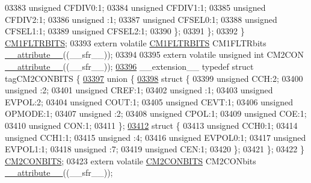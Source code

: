 \begin{DoxyCode}
03383       \textcolor{keywordtype}{unsigned} CFDIV0:1;
03384       \textcolor{keywordtype}{unsigned} CFDIV1:1;
03385       \textcolor{keywordtype}{unsigned} CFDIV2:1;
03386       \textcolor{keywordtype}{unsigned} :1;
03387       \textcolor{keywordtype}{unsigned} CFSEL0:1;
03388       \textcolor{keywordtype}{unsigned} CFSEL1:1;
03389       \textcolor{keywordtype}{unsigned} CFSEL2:1;
03390     \};
03391   \};
03392 \} \hyperlink{a00008_d0/d61/a00302}{CM1FLTRBITS};
03393 \textcolor{keyword}{extern} \textcolor{keyword}{volatile} \hyperlink{a00008_d0/d61/a00302}{CM1FLTRBITS} CM1FLTRbits \hyperlink{a00009_a493c46f03454991ccc5aa7a6e1dfb2a7}{\_\_attribute\_\_}((\_\_sfr\_\_));
03394 
03395 \textcolor{keyword}{extern} \textcolor{keyword}{volatile} \textcolor{keywordtype}{unsigned} \textcolor{keywordtype}{int}  CM2CON \hyperlink{a00009_a493c46f03454991ccc5aa7a6e1dfb2a7}{\_\_attribute\_\_}((\_\_sfr\_\_));
\hypertarget{a00009_source_l03396}{}\hyperlink{a00008}{03396} \_\_extension\_\_ \textcolor{keyword}{typedef} \textcolor{keyword}{struct }tagCM2CONBITS \{
\hypertarget{a00009_source_l03397}{}\hyperlink{a00009}{03397}   \textcolor{keyword}{union }\{
\hypertarget{a00009_source_l03398}{}\hyperlink{a00009}{03398}     \textcolor{keyword}{struct }\{
03399       \textcolor{keywordtype}{unsigned} CCH:2;
03400       \textcolor{keywordtype}{unsigned} :2;
03401       \textcolor{keywordtype}{unsigned} CREF:1;
03402       \textcolor{keywordtype}{unsigned} :1;
03403       \textcolor{keywordtype}{unsigned} EVPOL:2;
03404       \textcolor{keywordtype}{unsigned} COUT:1;
03405       \textcolor{keywordtype}{unsigned} CEVT:1;
03406       \textcolor{keywordtype}{unsigned} OPMODE:1;
03407       \textcolor{keywordtype}{unsigned} :2;
03408       \textcolor{keywordtype}{unsigned} CPOL:1;
03409       \textcolor{keywordtype}{unsigned} COE:1;
03410       \textcolor{keywordtype}{unsigned} CON:1;
03411     \};
\hypertarget{a00009_source_l03412}{}\hyperlink{a00009}{03412}     \textcolor{keyword}{struct }\{
03413       \textcolor{keywordtype}{unsigned} CCH0:1;
03414       \textcolor{keywordtype}{unsigned} CCH1:1;
03415       \textcolor{keywordtype}{unsigned} :4;
03416       \textcolor{keywordtype}{unsigned} EVPOL0:1;
03417       \textcolor{keywordtype}{unsigned} EVPOL1:1;
03418       \textcolor{keywordtype}{unsigned} :7;
03419       \textcolor{keywordtype}{unsigned} CEN:1;
03420     \};
03421   \};
03422 \} \hyperlink{a00008_d2/d71/a00309}{CM2CONBITS};
03423 \textcolor{keyword}{extern} \textcolor{keyword}{volatile} \hyperlink{a00008_d2/d71/a00309}{CM2CONBITS} CM2CONbits \hyperlink{a00009_a493c46f03454991ccc5aa7a6e1dfb2a7}{\_\_attribute\_\_}((\_\_sfr\_\_));

\end{DoxyCode}
